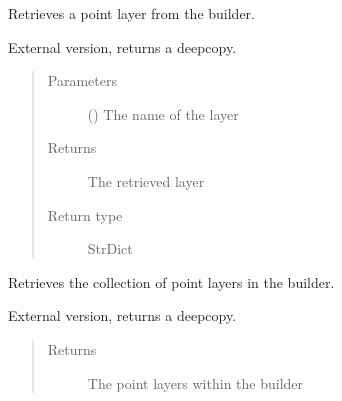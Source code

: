 \documentclass[letterpaper,10pt,english]{sphinxmanual}
\begin{document}
\begin{fulllineitems}
\begin{fulllineitems}
\begin{quote}
\begin{description}
\end{description}\end{quote}

\end{fulllineitems}


\begin{fulllineitems}
\label{\detokenize{builder:geohexviz.builder.PlotBuilder.get_point}}
\sphinxAtStartPar
Retrieves a point layer from the builder.

\sphinxAtStartPar
External version, returns a deepcopy.
\begin{quote}\begin{description}
\item[{Parameters}] \leavevmode
\sphinxAtStartPar
{} () \textendash{} The name of the layer

\item[{Returns}] \leavevmode
\sphinxAtStartPar
The retrieved layer

\item[{Return type}] \leavevmode
\sphinxAtStartPar
StrDict

\end{description}\end{quote}

\end{fulllineitems}


\begin{fulllineitems}
\label{\detokenize{builder:geohexviz.builder.PlotBuilder.get_points}}
\sphinxAtStartPar
Retrieves the collection of point layers in the builder.

\sphinxAtStartPar
External version, returns a deepcopy.
\begin{quote}\begin{description}
\item[{Returns}] \leavevmode
\sphinxAtStartPar
The point layers within the builder


\end{description}
\end{quote}
\end{fulllineitems}
\end{fulllineitems}
\end{document}
